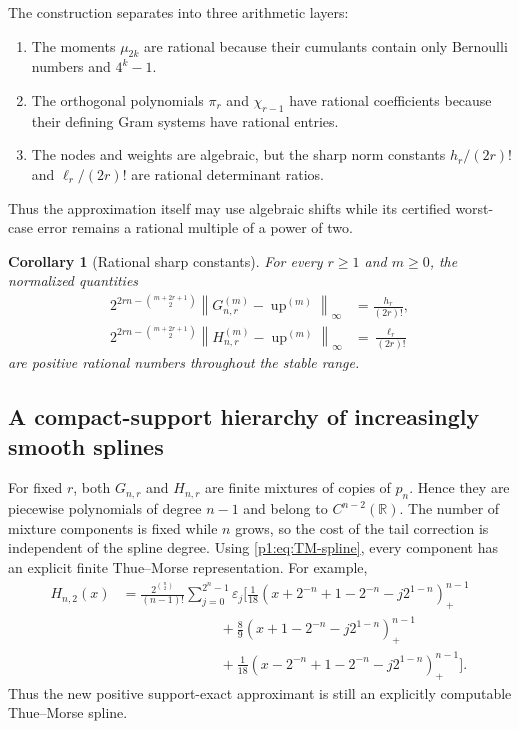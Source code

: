 \documentclass[11pt]{article}
\numberwithin{equation}{section}
\newtheorem{corollary}[theorem]{Corollary}
\theoremstyle{definition}
\theoremstyle{remark}
\newcommand{\R}{\mathbb R}
\newcommand{\Up}{\operatorname{up}}
\newcommand{\norm}[1]{\left\lVert#1\right\rVert}
\newcommand{\pospart}[1]{\left(#1\right)_{+}}
\newcommand{\TM}{\varepsilon}
\begin{document}
The construction separates into three arithmetic layers:
\begin{enumerate}
\item The moments $\mu_{2k}$ are rational because their cumulants contain only Bernoulli numbers and $4^k-1$.
\item The orthogonal polynomials $\pi_r$ and $\chi_{r-1}$ have rational coefficients because their defining Gram systems have rational entries.
\item The nodes and weights are algebraic, but the sharp norm constants $h_r/(2r)!$ and $\ell_r/(2r)!$ are rational determinant ratios.
\end{enumerate}
Thus the approximation itself may use algebraic shifts while its certified worst-case error remains a rational multiple of a power of two.

\begin{corollary}[Rational sharp constants]
For every $r\ge1$ and $m\ge0$, the normalized quantities
\begin{align}
 2^{2rn-\binom{m+2r+1}{2}}
 \norm{G_{n,r}^{(m)}-\Up^{(m)}}_\infty
 &=\frac{h_r}{(2r)!},\label{p1:eq:rational-G-normalized}\\
 2^{2rn-\binom{m+2r+1}{2}}
 \norm{H_{n,r}^{(m)}-\Up^{(m)}}_\infty
 &=\frac{\ell_r}{(2r)!}
 \label{p1:eq:rational-L-normalized}
\end{align}
are positive rational numbers throughout the stable range.
\end{corollary}

\subsection{A compact-support hierarchy of increasingly smooth splines}

For fixed $r$, both $G_{n,r}$ and $H_{n,r}$ are finite mixtures of copies of $p_n$.  Hence they are piecewise polynomials of degree $n-1$ and belong to $C^{n-2}(\R)$.  The number of mixture components is fixed while $n$ grows, so the cost of the tail correction is independent of the spline degree.  Using \eqref{p1:eq:TM-spline}, every component has an explicit finite Thue--Morse representation.  For example,
\begin{align}
 H_{n,2}(x)
 &=\frac{2^{\binom n2}}{(n-1)!}
 \sum_{j=0}^{2^n-1}\TM_j
 \Bigg[
 \frac1{18}\pospart{x+2^{-n}+1-2^{-n}-j2^{1-n}}^{n-1}\nonumber\\
 &\hspace{7em}+\frac89\pospart{x+1-2^{-n}-j2^{1-n}}^{n-1}\nonumber\\
 &\hspace{7em}+\frac1{18}\pospart{x-2^{-n}+1-2^{-n}-j2^{1-n}}^{n-1}
 \Bigg].
 \label{p1:eq:Hn2-TM}
\end{align}
Thus the new positive support-exact approximant is still an explicitly computable Thue--Morse spline.
\end{document}
